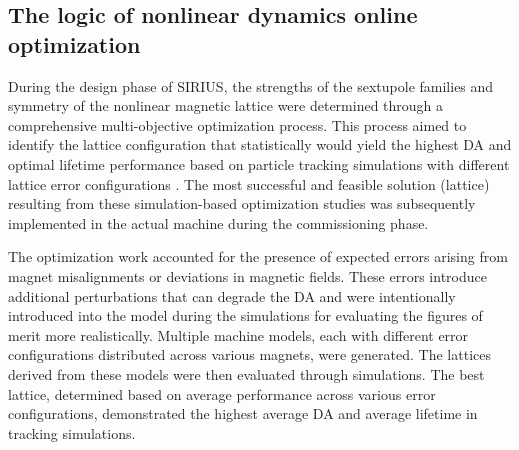 \subsection{The logic of nonlinear dynamics online optimization}
During the design phase of SIRIUS, the strengths of the sextupole families and symmetry of the nonlinear magnetic lattice were determined through a comprehensive multi-objective optimization process. This process aimed to identify the lattice configuration that statistically would yield the highest \gls*{DA} and optimal lifetime performance based on particle tracking simulations  with different lattice error configurations \cite{de_sa_optimization_2016}. The most successful and feasible solution (lattice) resulting from these simulation-based optimization studies was subsequently implemented in the actual machine during the commissioning phase.

The optimization work accounted for the presence of expected errors arising from magnet misalignments or deviations in magnetic fields. These errors introduce additional perturbations that can degrade the \gls*{DA} and were intentionally introduced into the model during the simulations for evaluating the figures of merit more realistically. Multiple machine models, each with different error configurations distributed across various magnets, were generated. The lattices derived from these models were then evaluated through simulations. The best lattice, determined based on average performance across various error configurations, demonstrated the highest average \gls*{DA} and average lifetime in tracking simulations.


